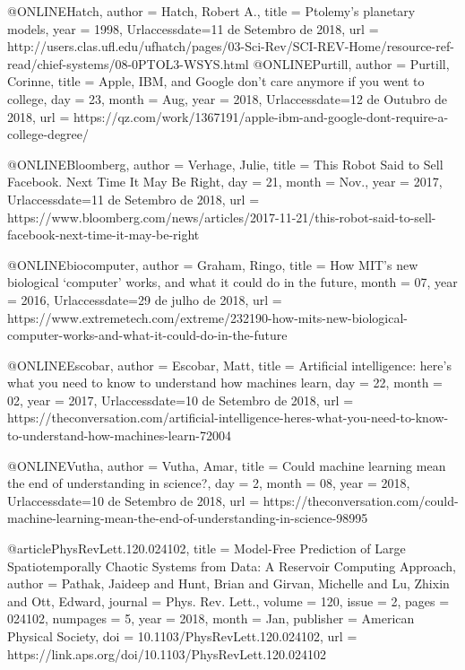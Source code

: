 @ONLINE{Hatch,
	author = {Hatch, Robert A.},
	title = {Ptolemy's planetary models},
	year = {1998},
	Urlaccessdate={11 de Setembro de 2018},
	url = {http://users.clas.ufl.edu/ufhatch/pages/03-Sci-Rev/SCI-REV-Home/resource-ref-read/chief-systems/08-0PTOL3-WSYS.html}
}
@ONLINE{Purtill,
	author = {Purtill, Corinne},
	title = {Apple, IBM, and Google don’t care anymore if you went to college},
	day = {23},
	month = {Aug},
	year = {2018},
	Urlaccessdate={12 de Outubro de 2018},
	url = {https://qz.com/work/1367191/apple-ibm-and-google-dont-require-a-college-degree/}
}

@ONLINE{Bloomberg,
	author = {Verhage, Julie},
	title = {This Robot Said to Sell Facebook. Next Time It May Be Right},
	day = {21},
	month = {Nov.},
	year = {2017},
	Urlaccessdate={11 de Setembro de 2018},
	url = {https://www.bloomberg.com/news/articles/2017-11-21/this-robot-said-to-sell-facebook-next-time-it-may-be-right}
}

@ONLINE{biocomputer,
	author = {Graham, Ringo},
	title = {How MIT’s new biological ‘computer’ works, and what it could do in the future},
	month = {07},
	year = {2016},
	Urlaccessdate={29 de julho de 2018},
	url = {https://www.extremetech.com/extreme/232190-how-mits-new-biological-computer-works-and-what-it-could-do-in-the-future}
}

@ONLINE{Escobar,
	author = {Escobar, Matt},
	title = {Artificial intelligence: here’s what you need to know to understand how machines learn},
	day = {22},
	month = {02},
	year = {2017},
	Urlaccessdate={10 de Setembro de 2018},
	url = {https://theconversation.com/artificial-intelligence-heres-what-you-need-to-know-to-understand-how-machines-learn-72004}
}

@ONLINE{Vutha,
	author = {Vutha, Amar},
	title = {Could machine learning mean the end of understanding in science?},
	day = {2},
	month = {08},
	year = {2018},
	Urlaccessdate={10 de Setembro de 2018},
	url = {https://theconversation.com/could-machine-learning-mean-the-end-of-understanding-in-science-98995}
}

@article{PhysRevLett.120.024102,
  title = {Model-Free Prediction of Large Spatiotemporally Chaotic Systems from Data: A Reservoir Computing Approach},
  author = {Pathak, Jaideep and Hunt, Brian and Girvan, Michelle and Lu, Zhixin and Ott, Edward},
  journal = {Phys. Rev. Lett.},
  volume = {120},
  issue = {2},
  pages = {024102},
  numpages = {5},
  year = {2018},
  month = {Jan},
  publisher = {American Physical Society},
  doi = {10.1103/PhysRevLett.120.024102},
  url = {https://link.aps.org/doi/10.1103/PhysRevLett.120.024102}
}


